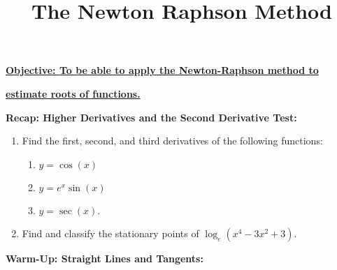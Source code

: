 \documentclass{article}
\begin{document}
\title{The Newton Raphson Method}
\date{}

\maketitle
\thispagestyle{empty}

\Large

\textbf{\underline{Objective: To be able to apply the Newton-Raphson method to}}

\textbf{\underline{estimate roots of functions.}}




\vspace{5mm}


\textbf{Recap: Higher Derivatives and the Second Derivative Test:}

\vspace{5mm}


\begin{enumerate}
	\item Find the first, second, and third derivatives of the following functions:
		\begin{enumerate}
			\item $y=\cos(x)$
			\item $y=e^x\sin(x)$
			\item $y=\sec(x)$.
		\end{enumerate}
	\item Find and classify the stationary points of $\log_e(x^4-3x^2+3)$.
\end{enumerate}

\bigskip




\clearpage


{\bf Warm-Up: Straight Lines and Tangents:}

\vspace{5mm}
\end{document}
